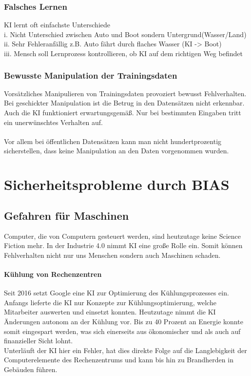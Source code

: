 \documentclass[12pt,oneside,a4paper,parskip]{scrbook}
\begin{document}
\subsection{Falsches Lernen}
KI lernt oft einfachste Unterschiede
\\i.	Nicht Unterschied zwischen Auto und Boot sondern Untergrund(Wasser/Land)
\\ii.	Sehr Fehleranfällig z.B. Auto fährt durch flaches Wasser (KI -> Boot)
\\iii. 	Mensch soll Lernprozess kontrollieren, ob KI auf dem richtigen Weg befindet
\subsection{Bewusste Manipulation der Trainingsdaten}
Vorsätzliches Manipulieren von Trainingsdaten provoziert bewusst Fehlverhalten. Bei geschickter Manipulation ist die Betrug in den Datensätzen nicht erkennbar. Auch die KI funktioniert erwartungsgemäß. Nur bei bestimmten Eingaben tritt ein unerwünschtes Verhalten auf. \\\\
Vor allem bei öffentlichen Datensätzen kann man nicht hundertprozentig sicherstellen, dass keine Manipulation an den Daten vorgenommen wurden.

\chapter{Sicherheitsprobleme durch BIAS}

\section{Gefahren für Maschinen}
Computer, die von Computern gesteuert werden, sind heutzutage keine Science Fiction mehr. In der Industrie 4.0 nimmt KI eine große Rolle ein. Somit können Fehlverhalten nicht nur uns Menschen sondern auch Maschinen schaden.
\subsubsection{Kühlung von Rechenzentren}
Seit 2016 setzt Google eine KI zur Optimierung des Kühlungsprozesses ein. Anfangs lieferte die KI nur Konzepte zur Kühlungsoptimierung, welche Mitarbeiter auswerten und einsetzt konnten. Heutzutage nimmt die KI Änderungen autonom an der Kühlung vor. Bis zu 40 Prozent an Energie konnte somit eingespart werden, was sich einerseits aus ökonomischer und als auch auf finanzieller Sicht lohnt.\\
Unterläuft der KI hier ein Fehler, hat dies direkte Folge auf die Langlebigkeit der Computerelemente des Rechenzentrums und kann bis hin zu Brandherden in Gebäuden führen.
\end{document}

